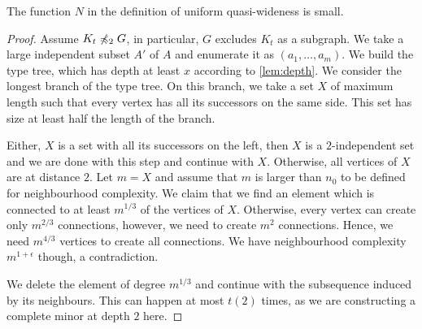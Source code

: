 \begin{theorem}
The function $N$ in the definition of uniform quasi-wideness
is small.
\end{theorem}
\begin{proof}
Assume $K_t\not\preccurlyeq_2G$, in particular, $G$ excludes $K_t$
as a subgraph. We take a large independent subset $A'$ of $A$ and
enumerate it as $(a_1,\ldots, a_m)$. We build the type
tree, which has depth at least $x$ according to \cref{lem:depth}. 
We consider the longest branch of the type tree. On this branch, 
we take a set $X$ of maximum length such that every vertex has 
all its successors on the same side. This set has size at least
half the length of the branch. 

Either, $X$ is a set with all its successors on the left, then $X$ 
is a $2$-independent set and we are done with this step and
continue with $X$. Otherwise, all vertices of $X$ are at distance
$2$. Let $m=X$ and assume that $m$ is larger than $n_0$ to
be defined for neighbourhood complexity.
We claim that we find an element which is connected to at least $m^{1/3}$
of the vertices of $X$. Otherwise, every vertex
can create only $m^{2/3}$ connections, however, we need
to create $m^2$ connections. Hence, we need $m^{4/3}$ vertices
to create all connections. We have neighbourhood complexity
$m^{1+\epsilon}$ though, a contradiction. 

We delete the element of degree $m^{1/3}$ 
and continue with the subsequence
induced by its neighbours. This can happen at most 
$t(2)$ times, as we are constructing a complete minor at 
depth $2$ here. 
\end{proof}

